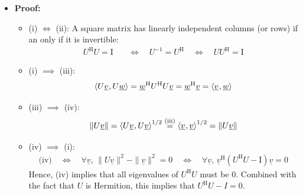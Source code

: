 \documentclass[11pt,twoside]{report}
\newcommand{\vecnot}{\underline}
\newcommand{\Id}{{\mathrm{I}}}
\newcommand{\Herm}{{\mathrm{H}}}
\newcommand{\tinner}[2]{{\langle #1 \mskip1mu , #2 \rangle}}
\begin{document}
\begin{itemize}
\item \textbf{Proof:}  
\begin{itemize}
\item (i) $\iff $ (ii): A square matrix has linearly independent columns (or rows) if an only if it is invertible: %
\begin{align*}
U^\Herm U = \Id  \quad %
& \iff  \quad  U^{-1} = U^\Herm \quad \iff \quad  U U^\Herm = \Id  
\end{align*}
\item (i) $\implies$ (iii): 
\[
\tinner{ U \vecnot{v} }{ U \vecnot{w} } = \vecnot{w}^\Herm U^\Herm U \vecnot{v} = \vecnot{w}^\Herm \vecnot{v} = \tinner{ \vecnot{v} }{ \vecnot{w} }\]

\item (iii) $\implies$ (iv): 
\[
\| U \vecnot{v} \| =\tinner{ U \vecnot{v} }{ U \vecnot{v} }^{1/2}  \overset{\text{(iii)}}{ =} \tinner{ \vecnot{v} }{  \vecnot{v} }^{1/2}  = \| U \vecnot{v} \|
\]

\item (iv) $\implies$ (i): 
\begin{align*}
\text{(iv)} \quad \iff  \quad \forall \vecnot{v}, \,   \| U \vecnot{v} \|^2 \!- \| \vecnot{v} \|^2= 0 \quad \iff \quad  \forall \vecnot{v}, \,  \vecnot{v}^\Herm (U^\Herm U - \Id) \vecnot{v} = 0 
\end{align*}
Hence, (iv) implies that all eigenvalues of $U^\Herm U$ must be 0. Combined with the fact that $U$ is Hermition, this implies  that $U^\Herm U - I = 0$.

\end{itemize} 



\end{itemize}
\end{document}
